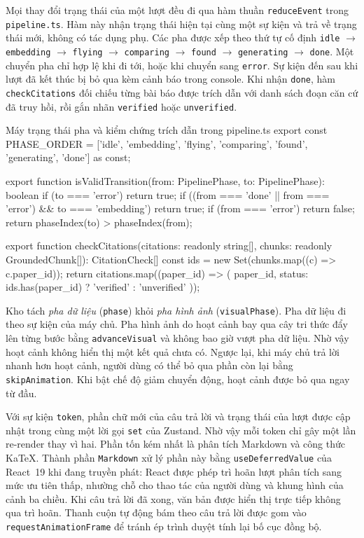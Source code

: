 \begin{sloppypar}
Mọi thay đổi trạng thái của một lượt đều đi qua hàm thuần \texttt{reduceEvent} trong \texttt{pipeline.ts}. Hàm này nhận trạng thái hiện tại cùng một sự kiện và trả về trạng thái mới, không có tác dụng phụ. Các pha được xếp theo thứ tự cố định \texttt{idle} $\rightarrow$ \texttt{embedding} $\rightarrow$ \texttt{flying} $\rightarrow$ \texttt{comparing} $\rightarrow$ \texttt{found} $\rightarrow$ \texttt{generating} $\rightarrow$ \texttt{done}. Một chuyển pha chỉ hợp lệ khi đi tới, hoặc khi chuyển sang \texttt{error}. Sự kiện đến sau khi lượt đã kết thúc bị bỏ qua kèm cảnh báo trong console. Khi nhận \texttt{done}, hàm \texttt{checkCitations} đối chiếu từng bài báo được trích dẫn với danh sách đoạn căn cứ đã truy hồi, rồi gắn nhãn \texttt{verified} hoặc \texttt{unverified}.
\end{sloppypar}

\begin{tsbox}{Máy trạng thái pha và kiểm chứng trích dẫn trong pipeline.ts}
export const PHASE_ORDER = ['idle', 'embedding', 'flying', 'comparing', 'found', 'generating', 'done'] as const;

export function isValidTransition(from: PipelinePhase, to: PipelinePhase): boolean {
  if (to === 'error') return true;
  if ((from === 'done' || from === 'error') && to === 'embedding') return true;
  if (from === 'error') return false;
  return phaseIndex(to) > phaseIndex(from);
}

export function checkCitations(citations: readonly string[], chunks: readonly GroundedChunk[]): CitationCheck[] {
  const ids = new Set(chunks.map((c) => c.paper_id));
  return citations.map((paper_id) => ({ paper_id, status: ids.has(paper_id) ? 'verified' : 'unverified' }));
}
\end{tsbox}

Kho tách \emph{pha dữ liệu} (\texttt{phase}) khỏi \emph{pha hình ảnh} (\texttt{visualPhase}). Pha dữ liệu đi theo sự kiện của máy chủ. Pha hình ảnh do hoạt cảnh bay qua cây tri thức đẩy lên từng bước bằng \texttt{advanceVisual} và không bao giờ vượt pha dữ liệu. Nhờ vậy hoạt cảnh không hiển thị một kết quả chưa có. Ngược lại, khi máy chủ trả lời nhanh hơn hoạt cảnh, người dùng có thể bỏ qua phần còn lại bằng \texttt{skipAnimation}. Khi bật chế độ giảm chuyển động, hoạt cảnh được bỏ qua ngay từ đầu.

Với sự kiện \texttt{token}, phần chữ mới của câu trả lời và trạng thái của lượt được cập nhật trong cùng một lời gọi \texttt{set} của Zustand. Nhờ vậy mỗi token chỉ gây một lần re-render thay vì hai. Phần tốn kém nhất là phân tích Markdown và công thức KaTeX. Thành phần \texttt{Markdown} xử lý phần này bằng \texttt{useDeferredValue} của React~19 khi đang truyền phát: React được phép trì hoãn lượt phân tích sang mức ưu tiên thấp, nhường chỗ cho thao tác của người dùng và khung hình của cảnh ba chiều. Khi câu trả lời đã xong, văn bản được hiển thị trực tiếp không qua trì hoãn. Thanh cuộn tự động bám theo câu trả lời được gom vào \texttt{requestAnimationFrame} để tránh ép trình duyệt tính lại bố cục đồng bộ.

